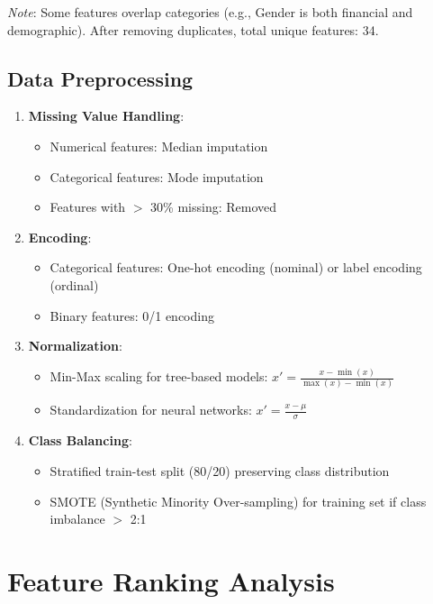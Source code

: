 \textit{Note}: Some features overlap categories (e.g., Gender is both financial and demographic). After removing duplicates, total unique features: 34.

\subsection{Data Preprocessing}

\begin{enumerate}
\item \textbf{Missing Value Handling}: 
\begin{itemize}
\item Numerical features: Median imputation
\item Categorical features: Mode imputation
\item Features with $>$ 30\% missing: Removed
\end{itemize}

\item \textbf{Encoding}:
\begin{itemize}
\item Categorical features: One-hot encoding (nominal) or label encoding (ordinal)
\item Binary features: 0/1 encoding
\end{itemize}

\item \textbf{Normalization}:
\begin{itemize}
\item Min-Max scaling for tree-based models: $x' = \frac{x - \min(x)}{\max(x) - \min(x)}$
\item Standardization for neural networks: $x' = \frac{x - \mu}{\sigma}$
\end{itemize}

\item \textbf{Class Balancing}:
\begin{itemize}
\item Stratified train-test split (80/20) preserving class distribution
\item SMOTE (Synthetic Minority Over-sampling) for training set if class imbalance $>$ 2:1
\end{itemize}
\end{enumerate}

\section{Feature Ranking Analysis}

